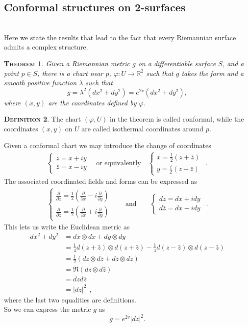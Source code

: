 \documentclass[a4paper,11pt,openright,twoside]{book}
\newcommand{\R}{\mathbb{R}}
\newcommand{\1}{\mathds{1}}
\theoremstyle{plain}
\newtheorem{thm}{\textsc{Theorem}}[chapter]
\theoremstyle{definition}
\newtheorem{defn}[thm]{\textsc{Definition}}
\theoremstyle{remark}
\begin{document}
\subsection{Conformal structures on 2-surfaces}\mbox{}\\
Here we state the results that lead to the fact that every Riemannian surface admits a complex structure.
\begin{thm}
	Given  a Riemannian metric $g$ on a differentiable surface $S$, and a point $p\in S$, there is a chart near $p$, $\varphi:U\to \R^2$ such that $g$ takes the form and a smooth positive function $\lambda$ such that
	\[g  = \lambda^2(dx^2+dy^2) = e^{2v}(dx^2+dy^2),\]
	where $(x,y)$ are the coordinates defined by $\varphi$.
\end{thm}
\begin{defn}
	The chart $(\varphi,U)$ in the theorem is called conformal, while the coordinates $(x,y)$ on $U$ are called isothermal coordinates around $p$.\\
\end{defn}
Given a conformal chart we may introduce the change of coordinates
\begin{align*}
	\begin{cases}
		z = x+iy\\
		\bar z = x-iy
	\end{cases}
	\quad \text{or equivalently}
	\quad
	\begin{cases}
		x = \frac{1}{2} (z + \bar z)\\
		y = \frac{i}{2}(z- \bar z)
	\end{cases}
\ \ . 
\end{align*}
The associated coordinated fields and forms can be expressed as
\begin{align*}
	\begin{cases}
		\displaystyle\frac{\partial  }{\partial z}  = \frac{1}{2}( \frac{\partial  }{\partial x} - i \frac{\partial  }{\partial y} ) \\
		\displaystyle\frac{\partial  }{\partial \bar z} = \frac{1}{2} ( \frac{\partial  }{\partial x} + i \frac{\partial  }{\partial y} ) 
	\end{cases}
	\qquad \text{and}
	\qquad
	\begin{cases}
		dz = dx + idy \\
		d \bar z = dx -idy
	\end{cases}
\ \ . 
\end{align*}
This lets us write the Euclidean metric as
\begin{align*}
	dx^2+dy^2 &=  dx \otimes dx + dy \otimes dy \\
		&= \frac{1}{4} d(z+ \bar z) \otimes d(z + \bar z) - \frac{1}{4} d(z-\bar z) \otimes d(z- \bar z)\\
		&= \frac{1}{2}( dz \otimes d \bar z + d \bar z \otimes dz)\\
		&= \Re(dz \otimes d \bar z)\\
		&=  dz d \bar z\\
		&= |dz|^2
\ \ , 
\end{align*}
where the last two equalities are definitions.\\
So we can express the metric $g$ as
\[ g = e^{2v} |dz|^2.\] 
\end{document}
